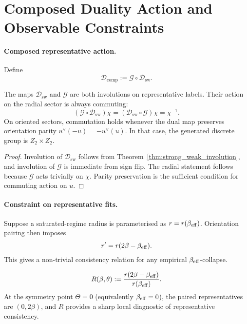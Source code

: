 \section{Composed Duality Action and Observable Constraints}
\label{sec:composed_duality}

\paragraph{Composed representative action.}
Define
\begin{equation}
  \mathcal{D}_{\mathrm{comp}} := \mathcal{G} \circ \mathcal{D}_{\mathrm{sw}}.
\end{equation}

\begin{proposition}
\label{prop:composed_action}
The maps \(\mathcal{D}_{\mathrm{sw}}\) and \(\mathcal{G}\) are both involutions on representative
labels. Their action on the radial sector is always commuting:
\begin{equation}
  (\mathcal{G}\circ\mathcal{D}_{\mathrm{sw}})\chi
  =(\mathcal{D}_{\mathrm{sw}}\circ\mathcal{G})\chi
  =\chi^{-1}.
\end{equation}
On oriented sectors, commutation holds whenever the dual map preserves orientation parity
\(u^\vee(-u)=-u^\vee(u)\). In that case, the generated discrete group is \(Z_2\times Z_2\).
\end{proposition}
\begin{proof}
Involution of \(\mathcal{D}_{\mathrm{sw}}\) follows from Theorem~\ref{thm:strong_weak_involution},
and involution of \(\mathcal{G}\) is immediate from sign flip. The radial statement follows because
\(\mathcal{G}\) acts trivially on \(\chi\). Parity preservation is the sufficient condition for commuting
action on \(u\).
\end{proof}

\paragraph{Constraint on representative fits.}
Suppose a saturated-regime radius is parameterised as \(r=r(\beta_{\mathrm{eff}})\). Orientation pairing then
imposes
\begin{equation}
  r' = r(2\beta - \beta_{\mathrm{eff}}).
\end{equation}
This gives a non-trivial consistency relation for any empirical \(\beta_{\mathrm{eff}}\)-collapse.

\begin{corollary}
\label{cor:ratio_constraint}
\begin{equation}
  R(\beta,\theta) := \frac{r(2\beta-\beta_{\mathrm{eff}})}{r(\beta_{\mathrm{eff}})}.
\end{equation}
At the symmetry point \(\Theta=0\) (equivalently \(\beta_{\mathrm{eff}}=0\)), the paired representatives are
\((0,2\beta)\), and \(R\) provides a sharp local diagnostic of representative consistency.
\end{corollary}

